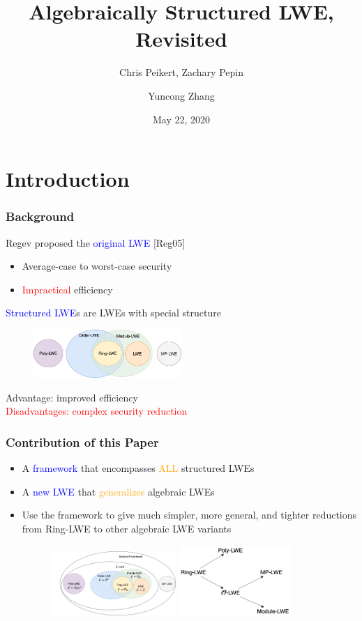 \documentclass{beamer}
\title{Algebraically Structured LWE, Revisited}
\subtitle{Chris Peikert, Zachary Pepin}
\author{Yuncong Zhang}
\date{May 22, 2020}
\newcommand{\blue}[1]{\textcolor{blue}{#1}}
\newcommand{\dgreen}[1]{\textcolor{dgreen}{#1}}
\newcommand{\orange}[1]{\textcolor{orange}{#1}}
\newcommand{\red}[1]{\textcolor{red}{#1}}
\begin{document}
\frame{\titlepage}


\section{Introduction}
\frame
{
  \frametitle{Background}
  Regev proposed the \blue{original LWE} [Reg05]

  \begin{itemize}
  	\item \dgreen{Average-case to worst-case} security
  	\item \red{Impractical} efficiency
  \end{itemize}

  \blue{Structured LWE}s are LWEs with special structure
  \begin{figure}[ht!]
  \includegraphics[width=0.5\textwidth]{files/Structured-LWE.png}
  \end{figure}

  \dgreen{Advantage: improved efficiency}\\
  \red{Disadvantages: complex security reduction}

}

\frame
{
  \frametitle{Contribution of this Paper}
  \begin{itemize}
  	\item A \blue{framework} that encompasses \orange{ALL} structured LWEs

  	\item A \blue{new LWE} that \orange{generalizes} algebraic LWEs

  	\item Use the framework to give much \dgreen{simpler}, \dgreen{more general}, and \dgreen{tighter} reductions from Ring-LWE to other algebraic LWE variants

  	\begin{figure}[ht!]
  	\includegraphics[width=0.45\textwidth]{files/General-LWE.png}
  	\includegraphics[width=0.4\textwidth]{files/LWE-Reductions.png}
  	\end{figure}

  \end{itemize}
}
\end{document}
